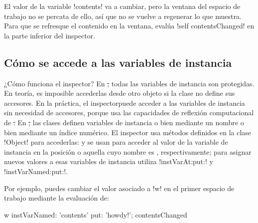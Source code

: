 \documentclass[a4paper,10pt,twoside]{book}
\begin{document}

El valor de la variable \ct!contents! va a cambiar, pero la ventana
del espacio de trabajo no se percata de ello, así que no se vuelve a
regenerar lo que muestra.  Para que se refresque el contenido en la
ventana, evalúa \ct!self contentsChanged!  en la parte inferior del
inspector.

\subsection{Cómo se accede a las variables de instancia}


¿Cómo funciona el inspector?  En \st, todas las variables de instancia
son protegidas.  En teoría, es imposible accederlas desde otro objeto
si la clase no define sus accesores.  En la práctica, el
inspectorpuede acceder a las variables de instancia sin necesidad de
accesores, porque usa las capacidades de reflexión computacional de
\st.  En \st, las clases definen variables de instancia o bien
mediante un nombre o bien mediante un índice numérico.  El inspector
usa métodos definidos en la clase \ct!Object! para accederlas:
 y  se
usan para acceder al valor de la variable de instancia en la posición
 o aquella cuyo nombre es ,
respectivamente; para asignar nuevos valores a esas variables de
instancia utiliza \ct!instVarAt:put:! y \ct!instVarNamed:put:!.
 
 

Por ejemplo, puedes cambiar el valor asociado a \ct!w! en el primer
espacio de trabajo mediante la evaluación de:
\begin{code}{}
w instVarNamed: 'contents' put: 'howdy!'; contentsChanged
\end{code}

\end{document}
